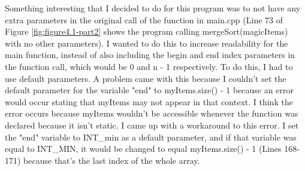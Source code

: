 \documentclass[letterpaper, 10pt]{article}
\begin{document}
\noindent
Something interesting that I decided to do for this program was to not have any extra parameters in the original call of the function in main.cpp (Line 73 of Figure \ref{fig:figure4.1-part2} shows the program calling mergeSort(magicItems) with no other parameters). I wanted to do this to increase readability for the main function, instead of also including the begin and end index parameters in the function call, which would be 0 and n - 1 respectively. To do this, I had to use default parameters. A problem came with this because I couldn't set the default parameter for the variable "end" to myItems.size() - 1 because an error would occur stating that myItems may not appear in that context. I think the error occurs because myItems wouldn't be accessible whenever the function was declared because it isn't static. I came up with a workaround to this error. I set the "end" variable to INT\_min as a default parameter, and if that variable was equal to INT\_MIN, it would be changed to equal myItems.size() - 1 (Lines 168-171) because that's the last index of the whole array.
\vspace{1em}
\end{document}

